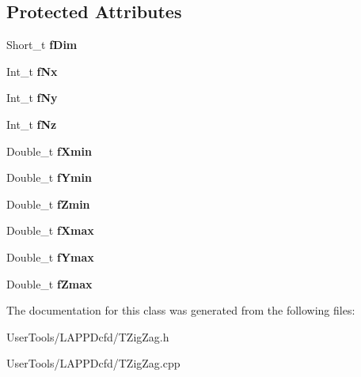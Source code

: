 \subsection*{Protected Attributes}
\begin{DoxyCompactItemize}
\item 
\hypertarget{classTZigZag_ad03af26416ed8b02193e3637563ea540}{
Short\_\-t {\bfseries fDim}}
\label{classTZigZag_ad03af26416ed8b02193e3637563ea540}

\item 
\hypertarget{classTZigZag_a7401638043cfe92e7ebc042ca3c6fc92}{
Int\_\-t {\bfseries fNx}}
\label{classTZigZag_a7401638043cfe92e7ebc042ca3c6fc92}

\item 
\hypertarget{classTZigZag_a99aadb7d7cac166797ec8be1002ff9ed}{
Int\_\-t {\bfseries fNy}}
\label{classTZigZag_a99aadb7d7cac166797ec8be1002ff9ed}

\item 
\hypertarget{classTZigZag_a2391bf9bdee4fa705c1e1ff7fe164fa5}{
Int\_\-t {\bfseries fNz}}
\label{classTZigZag_a2391bf9bdee4fa705c1e1ff7fe164fa5}

\item 
\hypertarget{classTZigZag_afb465288652c5ef5687eaec8fdfd66c7}{
Double\_\-t {\bfseries fXmin}}
\label{classTZigZag_afb465288652c5ef5687eaec8fdfd66c7}

\item 
\hypertarget{classTZigZag_afb7ad8177f97744db5400b139bd58891}{
Double\_\-t {\bfseries fYmin}}
\label{classTZigZag_afb7ad8177f97744db5400b139bd58891}

\item 
\hypertarget{classTZigZag_ad714cd33226f78923d31e4644abb4907}{
Double\_\-t {\bfseries fZmin}}
\label{classTZigZag_ad714cd33226f78923d31e4644abb4907}

\item 
\hypertarget{classTZigZag_a4de41dd4ba2910dd539f5ae8c2c2f747}{
Double\_\-t {\bfseries fXmax}}
\label{classTZigZag_a4de41dd4ba2910dd539f5ae8c2c2f747}

\item 
\hypertarget{classTZigZag_abdade06d6d715ea1fd15f16079fb1448}{
Double\_\-t {\bfseries fYmax}}
\label{classTZigZag_abdade06d6d715ea1fd15f16079fb1448}

\item 
\hypertarget{classTZigZag_a5008b2801f2050403b3ada62d0522317}{
Double\_\-t {\bfseries fZmax}}
\label{classTZigZag_a5008b2801f2050403b3ada62d0522317}

\end{DoxyCompactItemize}


The documentation for this class was generated from the following files:\begin{DoxyCompactItemize}
\item 
UserTools/LAPPDcfd/TZigZag.h\item 
UserTools/LAPPDcfd/TZigZag.cpp\end{DoxyCompactItemize}
